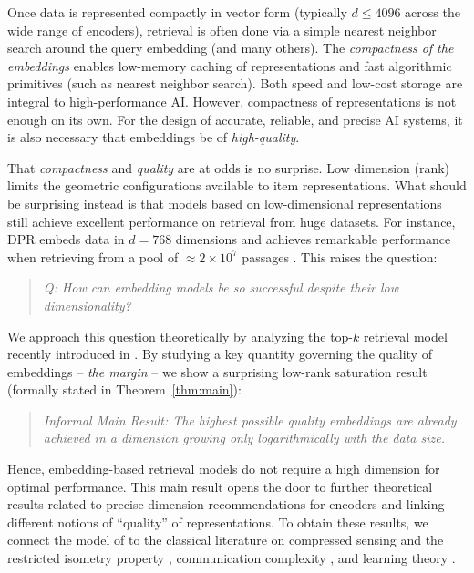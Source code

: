\documentclass[preprint]{article}
\begin{document}
Once data is represented compactly in vector form (typically $d\le 4096$ across the wide range of encoders), retrieval is often done via a simple nearest neighbor search around the query embedding \cite{jegou2011product,johnson2019billion,malkov2020hnsw,radford21clip,caron21dino,chen2020simple,dwibedi2021little,bolya2025perception} (and many others). The \emph{compactness of the embeddings} enables low-memory caching of representations and fast algorithmic primitives (such as nearest neighbor search). Both speed and low-cost storage are integral to high-performance  AI. However, compactness of representations is not enough on its own. 
For the design of accurate, reliable, and precise AI systems, it is also necessary that embeddings be of \emph{high-quality}.

That \emph{compactness} and \emph{quality} are at odds is no surprise. Low dimension (rank) limits the geometric configurations available to item representations. What should be surprising instead is that models based on low-dimensional representations still achieve excellent performance on retrieval from huge datasets.
For instance, DPR embeds data in $d = 768$ dimensions and achieves remarkable performance when retrieving from a pool of $\approx 2\times 10^7$ passages \cite{KarpukhinEtAl2020}. This raises the question:

\begin{quote}
\centering
\emph{Q: How can embedding models be so successful despite their low dimensionality?}
\end{quote}

We approach this question theoretically by analyzing the top-$k$ retrieval model recently introduced in \cite{weller2025theoretical}. By studying a key quantity governing the quality of embeddings -- \emph{the margin} -- we show a surprising low-rank saturation result (formally stated in Theorem~\ref{thm:main}): 
\begin{quote}
\centering
\emph{Informal Main Result: The highest possible quality embeddings are already achieved in a dimension growing only logarithmically with the data size.}
\end{quote}
Hence, embedding-based retrieval models do not require a high dimension for optimal performance. This main result opens the door to 
further theoretical results related to precise dimension recommendations for encoders and linking different notions of ``quality'' of representations. To obtain these results, we connect the model of \cite{weller2025theoretical} to the classical literature on compressed sensing and the restricted isometry property \cite{CandesTao2005,foucart2010gelfand,foucart2013mathematical,novak1995optimal}, communication complexity \cite{AlonFranklRodl1985,sherstov2009lower,linial2009learning}, and learning theory \cite{ForsterSchmittSimonSuttorp2003}.   
\end{document}
